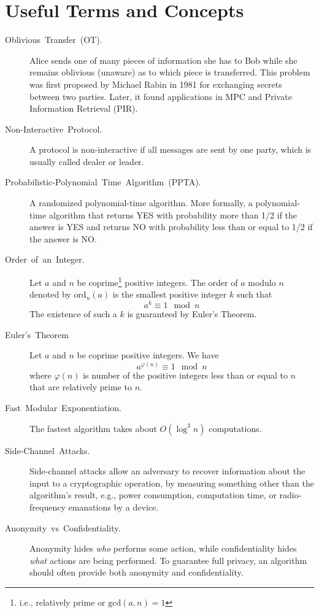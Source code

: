 \documentclass[10pt]{article}
\theoremstyle{plain}
\begin{document}
\section{Useful Terms and Concepts}
\begin{description}
	\item [{Oblivious~Transfer~(OT).}] Alice sends one of many pieces of
	information she has to Bob while she remains oblivious (unaware) as
	to which piece is transferred. This problem was first proposed by
	Michael Rabin in 1981 for exchanging secrets between two parties.
	Later, it found applications in MPC and Private Information Retrieval
	(PIR).
	\item [{Non-Interactive~Protocol.}] A protocol is non-interactive if all
	messages are sent by one party, which is usually called dealer or
	leader.
	\item [{Probabilistic-Polynomial~Time~Algorithm~(PPTA).}] A randomized
	polynomial-time algorithm. More formally, a polynomial-time algorithm
	that returns YES with probability more than 1/2 if the answer is YES
	and returns NO with probability less than or equal to 1/2 if the answer
	is NO.
	\item [{Order~of~an~Integer.}] Let $a$ and $n$ be coprime\footnote{i.e., relatively prime or $\mathrm{gcd}(a,n)=1$}
	positive integers. The order of $a$ modulo $n$ denoted by $\mathrm{ord}_{n}(a)$
	is the smallest positive integer $k$ such that 
	\[
	a^{k}\equiv1\mod n
	\]
	The existence of such a $k$ is guaranteed by Euler's Theorem.
	\item [{Euler's~Theorem}] Let $a$ and $n$ be coprime positive integers.
	We have 
	\[
	a^{\varphi(n)}\equiv1\mod{n}
	\]
	where $\varphi(n)$ is number of the positive integers less than or
	equal to $n$ that are relatively prime to $n$.
	\item [{Fast~Modular~Exponentiation.}] The fastest algorithm takes about
	$O(\log^{3}{n})$ computations.
	\item [{Side-Channel~Attacks.}] Side-channel attacks allow an adversary
	to recover information about the input to a cryptographic operation,
	by measuring something other than the algorithm's result, e.g., power
	consumption, computation time, or radio-frequency emanations by a
	device.
	\item [{Anonymity~vs~Confidentiality.}] Anonymity hides \emph{who} performs
	some action, while confidentiality hides \emph{what} actions are being
	performed. To guarantee full privacy, an algorithm should often provide
	both anonymity and confidentiality.
\end{description}


\end{document}
